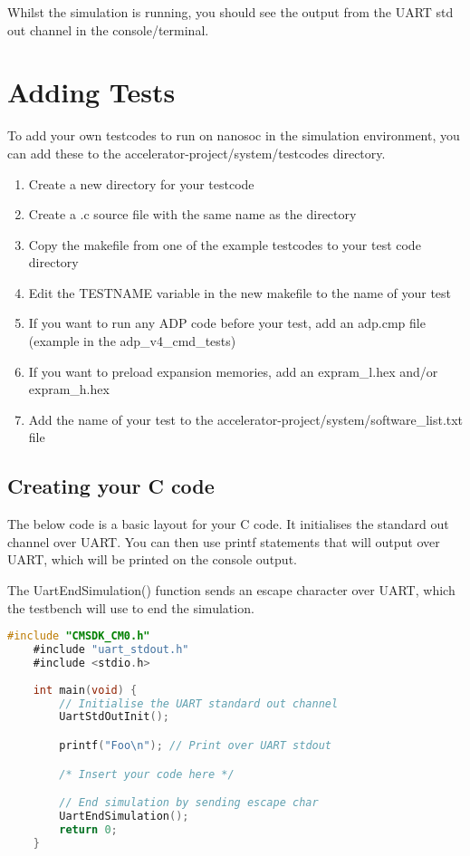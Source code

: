 \documentclass{report}
\begin{document}
Whilst the simulation is running, you should see the output from the UART std out channel in the console/terminal.


\section{Adding Tests}
To add your own testcodes to run on nanosoc in the simulation environment, you can add these to the accelerator-project/system/testcodes directory.

\begin{enumerate}
    \item Create a new directory for your testcode 
    \item Create a .c source file with the same name as the directory
    \item Copy the makefile from one of the example testcodes to your test code directory
    \item Edit the TESTNAME variable in the new makefile to the name of your test
    \item If you want to run any ADP code before your test, add an adp.cmp file (example in the adp\_v4\_cmd\_tests)
    \item If you want to preload expansion memories, add an expram\_l.hex and/or expram\_h.hex
    \item Add the name of your test to the accelerator-project/system/software\_list.txt file 
\end{enumerate}

\subsection{Creating your C code}
The below code is a basic layout for your C code. It initialises the standard out channel over UART. You can then use printf
statements that will output over UART, which will be printed on the console output.

The UartEndSimulation() function sends an escape character over UART, which the testbench will use to end the simulation.

\begin{lstlisting}[language=C, caption=Basic Template]
    #include "CMSDK_CM0.h"
    #include "uart_stdout.h"
    #include <stdio.h>
    
    int main(void) {
        // Initialise the UART standard out channel
        UartStdOutInit(); 

        printf("Foo\n"); // Print over UART stdout

        /* Insert your code here */

        // End simulation by sending escape char 
        UartEndSimulation();
        return 0;
    }
\end{lstlisting}
\end{document}
